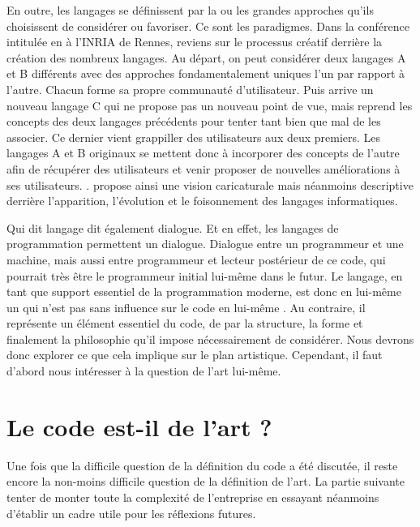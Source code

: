 \documentclass[12pt]{article} %
\begin{document}
En outre, les langages se définissent par la ou les grandes approches qu'ils choisissent de considérer ou favoriser. Ce sont les paradigmes. Dans la conférence intitulée  en  à l'INRIA de Rennes, \citeauthor{GerardBerry2015} reviens sur le processus créatif derrière la création des nombreux langages. Au départ, on peut considérer deux langages A et B différents avec des approches fondamentalement uniques l'un par rapport à l'autre. Chacun forme sa propre communauté d'utilisateur. Puis arrive un nouveau langage C qui ne propose pas un nouveau point de vue, mais reprend les concepts des deux langages précédents pour tenter tant bien que mal de les associer. Ce dernier vient grappiller des utilisateurs aux deux premiers. Les langages A et B originaux se mettent donc à incorporer des concepts de l'autre afin de récupérer des utilisateurs et venir proposer de nouvelles améliorations à ses utilisateurs.  \cite{GerardBerry2015}. \citeauthor{GerardBerry2015} propose ainsi une vision caricaturale mais néanmoins descriptive derrière l'apparition, l'évolution et le foisonnement des langages informatiques.

Qui dit langage dit également dialogue. Et en effet, les langages de programmation permettent un dialogue. Dialogue entre un programmeur et une machine, mais aussi entre programmeur et lecteur postérieur de ce code, qui pourrait très être le programmeur initial lui-même dans le futur. Le langage, en tant que support essentiel de la programmation moderne, est donc en lui-même un  \cite{GerardBerry2015} qui n'est pas sans influence sur le code en lui-même \cite{Dijkstra1976}. Au contraire, il représente un élément essentiel du code, de par la structure, la forme et finalement la philosophie qu'il impose nécessairement de considérer.  Nous devrons donc explorer ce que cela implique sur le plan artistique. Cependant, il faut d'abord nous intéresser à la question de l'art lui-même.

\section{Le code est-il de l'art ?}
Une fois que la difficile question de la définition du code a été discutée, il reste encore la non-moins difficile question de la définition de l'art. La partie suivante tenter de monter toute la complexité de l'entreprise en essayant néanmoins d'établir un cadre utile pour les réflexions futures.
\end{document}
